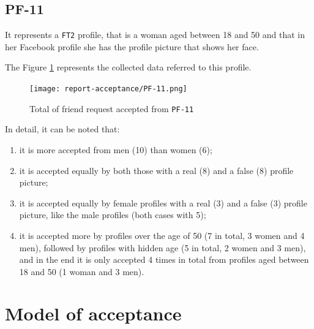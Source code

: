 \subsection*{PF-11}
It represents a \texttt{FT2} profile, that is a woman aged between 18 and 50 and that in her Facebook profile she has the profile picture that shows her face.
\par \noindent The Figure \ref{fig:accepted-from-PF11} represents the collected data referred to this profile.
\begin{figure}[H]	
	\centering
	\texttt{[image: report-acceptance/PF-11.png]} 
	\caption{Total of friend request accepted from \texttt{PF-11}}
	\label{fig:accepted-from-PF11}
\end{figure}
\par \noindent In detail, it can be noted that:
	\begin{enumerate}		
	\item it is more accepted from men (10) than women (6);
	\item it is accepted equally by both those with a real (8) and a false (8) profile picture;
	\item it is accepted equally by female profiles with a real (3) and a false (3) profile picture, like the male profiles (both cases with 5);
	\item it is accepted more by profiles over the age of 50 (7 in total, 3 women and 4 men), followed by profiles with hidden age (5 in total, 2 women and 3 men), and in the end it is only accepted 4 times in total from profiles aged between 18 and 50 (1 woman and 3 men).
\end{enumerate}

\newpage
\newpage
\section{Model of acceptance}

